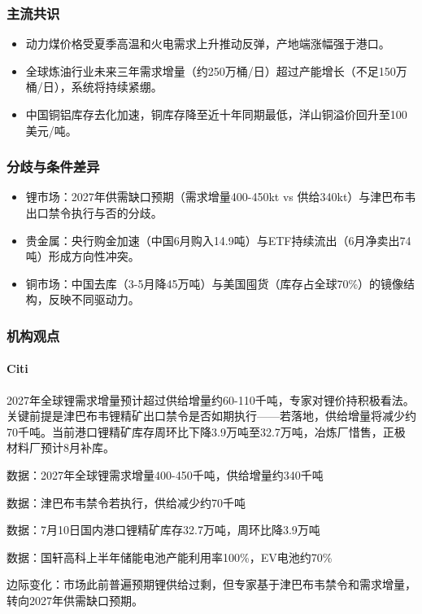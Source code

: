 \documentclass[11pt]{ctexart}
\begin{document}
\subsubsection*{主流共识}
\begin{itemize}
  \item 动力煤价格受夏季高温和火电需求上升推动反弹，产地端涨幅强于港口。
  \item 全球炼油行业未来三年需求增量（约250万桶/日）超过产能增长（不足150万桶/日），系统将持续紧绷。
  \item 中国铜铝库存去化加速，铜库存降至近十年同期最低，洋山铜溢价回升至100美元/吨。
\end{itemize}
\subsubsection*{分歧与条件差异}
\begin{itemize}
  \item 锂市场：2027年供需缺口预期（需求增量400-450kt vs 供给340kt）与津巴布韦出口禁令执行与否的分歧。
  \item 贵金属：央行购金加速（中国6月购入14.9吨）与ETF持续流出（6月净卖出74吨）形成方向性冲突。
  \item 铜市场：中国去库（3-5月降45万吨）与美国囤货（库存占全球70\%）的镜像结构，反映不同驱动力。
\end{itemize}
\subsubsection*{机构观点}
\paragraph{Citi} 2027年全球锂需求增量预计超过供给增量约60-110千吨，专家对锂价持积极看法。关键前提是津巴布韦锂精矿出口禁令是否如期执行——若落地，供给增量将减少约70千吨。当前港口锂精矿库存周环比下降3.9万吨至32.7万吨，冶炼厂惜售，正极材料厂预计8月补库。
{\small\color{refgray}数据：2027年全球锂需求增量400-450千吨，供给增量约340千吨\par}
{\small\color{refgray}数据：津巴布韦禁令若执行，供给减少约70千吨\par}
{\small\color{refgray}数据：7月10日国内港口锂精矿库存32.7万吨，周环比降3.9万吨\par}
{\small\color{refgray}数据：国轩高科上半年储能电池产能利用率100\%，EV电池约70\%\par}
{\small\color{refgray}边际变化：市场此前普遍预期锂供给过剩，但专家基于津巴布韦禁令和需求增量，转向2027年供需缺口预期。\par}
\end{document}
